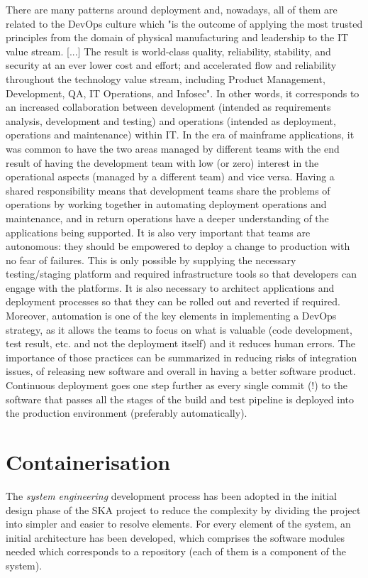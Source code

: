 \documentclass[a4paper,
               keeplastbox,   %
               ]{jacow}
\begin{document}
There are many patterns around deployment and, nowadays, all of them are related to the DevOps culture\cite{DevOps} which "is the outcome of applying the most trusted principles from the domain of physical manufacturing and leadership to the IT value stream. [...] The result is world-class quality, reliability, stability, and security at an ever lower cost and effort; and accelerated flow and reliability throughout the technology value stream, including Product Management, Development, QA, IT Operations, and Infosec". In other words, it corresponds to an increased collaboration between development (intended as requirements analysis, development and testing) and operations (intended as deployment, operations and maintenance) within IT. In the era of mainframe applications, it was common to have the two areas managed by different teams with the end result of having the development team with low (or zero) interest in the operational aspects (managed by a different team) and vice versa. Having a shared responsibility means that development teams share the problems of operations by working together in automating deployment operations and maintenance, and in return operations have a deeper understanding of the applications being supported. It is also very important that teams are autonomous: they should be empowered to deploy a change to production with no fear of failures. This is only possible by supplying the necessary testing/staging platform and required infrastructure tools so that developers can engage with the platforms.  It is also necessary to architect applications and deployment processes so that they can be rolled out and reverted if required.
Moreover, automation is one of the key elements in implementing a DevOps strategy, as it allows the teams to focus on what is valuable (code development, test result, etc. and not the deployment itself) and it reduces human errors.
The importance of those practices can be summarized in reducing risks of integration issues, of releasing new software and overall in having a better software product.
Continuous deployment goes one step further as every single commit (!) to the software that passes all the stages of the build and test pipeline is deployed into the production environment (preferably automatically).

\section{Containerisation} \label{containerisation}
The \textit{system engineering} development process has been adopted in the initial design phase of the SKA project to reduce the complexity by dividing the project into simpler and easier to resolve elements. For every element of the system, an initial architecture has been developed, which comprises the software modules needed which corresponds to a repository (each of them is a component of the system).
\end{document}
